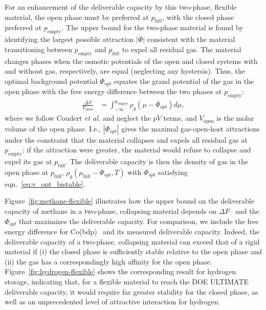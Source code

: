 \documentclass[pre,twocolumn]{revtex4-2}
\newcommand\V{\Phi}
\newcommand\pfull{\ensuremath{p_{\text{full}}}}
\newcommand\pempty{\ensuremath{p_{\text{empty}}}}
\newcommand\mufull{\ensuremath{\mu_{\text{full}}}}
\newcommand\muempty{\ensuremath{\mu_{\text{empty}}}}
\begin{document}
For an enhancement of the deliverable capacity by this two-phase, flexible material, 
the open phase must be preferred at $\pfull$, with the closed phase preferred at $\pempty$. 
The upper bound for the two-phase material is found by identifying the largest
possible attraction $|\V|$ consistent with the material transitioning between
$\pempty$ and $\pfull$ to expel all residual gas.
The material changes phases when the osmotic potentials of the open and closed systems 
with and without gas, respectively, are equal \cite{coudert2008thermodynamics} (neglecting any hystersis).
Thus, the optimal background potential $\V_{opt}$ equates the grand potential of the gas in the open phase 
with the free energy difference between the two phases at $\pempty$:
%
\begin{align}
    \frac{\Delta F}{V_{\text{open}}} &= \int_{-\infty}^{\muempty} \rho_g(\mu-\V_{opt})d\mu, \label{eq:v_opt_bistable}
\end{align}
where we follow Coudert \emph{et al.}\cite{coudert2008thermodynamics} and
neglect the $pV$ terms, and $V_{\text{open}}$ is the molar volume of the open
phase.
I.e., $|\V_{opt}|$ gives the maximal gas-open-host attractions under the constraint that the material collapses and expels all residual gas at $\pempty$; if the attraction were greater, the material would refuse to collapse and expel its gas at $\pfull$.
The deliverable capacity is then the density of gas in the open phase at $\pfull$, $\rho_g(\mufull{} - \V_{opt}, T)$ with $\V_{opt}$ satisfying eqn.~\ref{eq:v_opt_bistable}.

Figure~\ref{fig:methane-flexible} illustrates
how the upper bound on the deliverable capacity of methane in a two-phase,
collapsing material depends on $\Delta F$-- and the $\V_{opt}$ that maximizes the deliverable capacity. 
For comparison, we include the free energy
difference for Co(bdp)~\cite{choi2008broadly} and its measured deliverable capacity.
Indeed, the deliverable capacity of a two-phase, collapsing material can exceed that of a rigid material if 
(i) the closed phase is sufficiently stable relative to the open phase
and
(ii) the gas has a correspondingly high affinity for the open phase.
Figure~\ref{fig:hydrogen-flexible} shows the corresponding result for hydrogen storage, indicating that, for a flexible material to
reach the DOE ULTIMATE deliverable capacity, it would require far greater stability for the closed
phase, as well as an unprecedented level of attractive interaction for hydrogen.
\end{document}
